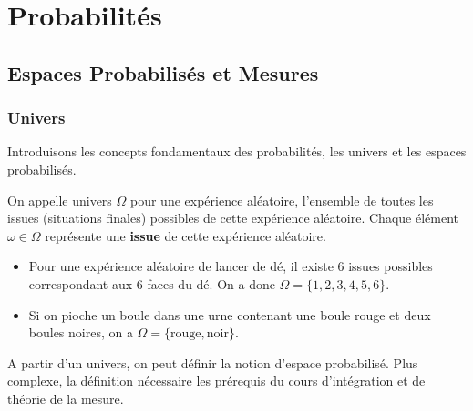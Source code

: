 \chapter{Probabilités}

\justify

\setlength{\parindent}{0pt}
\renewcommand{\labelitemi}{\textbullet} %




\section{Espaces Probabilisés et Mesures}

\subsection{Univers}

Introduisons les concepts fondamentaux des probabilités, les univers et les espaces probabilisés. 

\begin{definition}[Univers]
    On appelle univers $\Omega$ pour une expérience aléatoire, l'ensemble de toutes les issues (situations finales) possibles 
    de cette expérience aléatoire. Chaque élément $ \omega \in \Omega$ représente une \textbf{issue} de cette expérience aléatoire.  
\end{definition}

\begin{example}
    \begin{itemize}
        \item Pour une expérience aléatoire de lancer de dé, il existe 6 issues possibles correspondant aux 6 faces du dé. 
        On a donc $\Omega = \{1, 2, 3, 4, 5, 6\}$. 
        \item Si on pioche un boule dans une urne contenant une boule rouge et deux boules noires, on a 
        $ \Omega = \{\text{rouge}, \text{noir}\}$. 
    \end{itemize}
\end{example}

A partir d'un univers, on peut définir la notion d'espace probabilisé. Plus complexe, la définition nécessaire les prérequis 
du cours d'intégration et de théorie de la mesure. 

